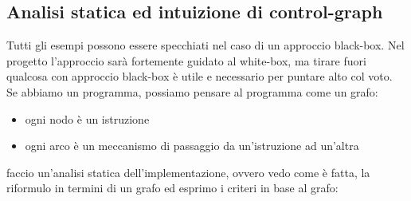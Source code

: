 \documentclass{article}
\begin{document}
\subsection{Analisi statica ed intuizione di control-graph}
Tutti gli esempi possono essere specchiati nel caso di un approccio black-box. Nel progetto l'approccio sarà fortemente guidato al white-box, ma tirare fuori qualcosa con approccio black-box è utile e necessario per puntare alto col voto.\\ Se abbiamo un programma, possiamo pensare al programma come un grafo:
\begin{itemize}
\item ogni nodo è un istruzione
\item ogni arco è un meccanismo di passaggio da un'istruzione ad un'altra
\end{itemize}
faccio un'analisi statica dell'implementazione, ovvero vedo come è fatta, la riformulo in termini di un grafo ed esprimo i criteri in base al grafo:
\end{document}
